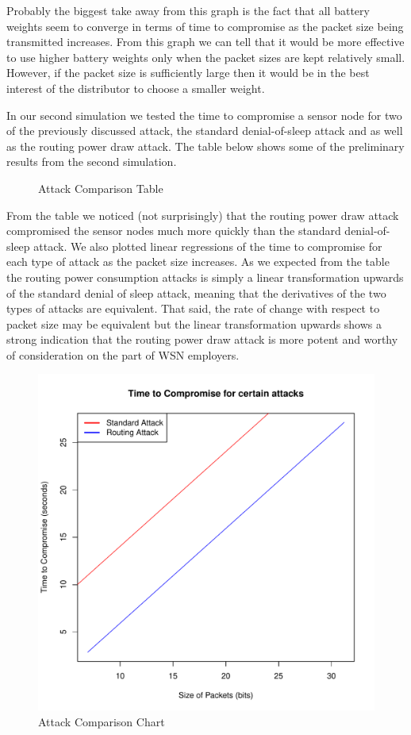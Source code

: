 Probably the biggest take away from this graph is the fact that all battery weights seem to converge in terms of time to compromise as the packet size being transmitted increases. From this graph we can tell that it would be more effective to use higher battery weights only when the packet sizes are kept relatively small. However, if the packet size is sufficiently large then it would be in the best interest of the distributor to choose a smaller weight. 

In our second simulation we tested the time to compromise a sensor node for two of the previously discussed attack, the standard denial-of-sleep attack and as well as the routing power draw attack. The table below shows some of the preliminary results from the second simulation. 

\begin{figure}[H]
\caption{Attack Comparison Table} 

\end{figure}

From the table we noticed (not surprisingly) that the routing power draw attack compromised the sensor nodes much more  quickly than the standard denial-of-sleep attack. We also plotted linear regressions of the time to compromise for each type of attack as the packet size increases. As we expected from the table the routing power consumption attacks is simply a linear transformation upwards of the standard denial of sleep attack, meaning that the derivatives of the two types of attacks are equivalent. That said, the rate of change with respect to packet size may be equivalent but the linear transformation upwards shows a strong indication that the routing power draw attack is more potent and worthy of consideration on the part of WSN employers. 

\begin{figure}[H]
\caption{Attack Comparison Chart}
\includegraphics[width=\linewidth]{Figures/pktszndtmtocmp1.pdf}
\end{figure}
	
